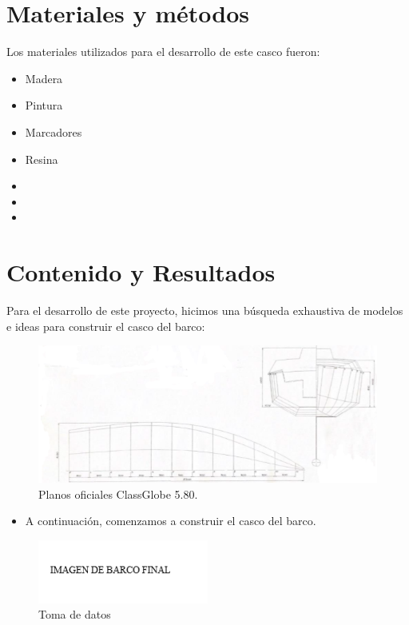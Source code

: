 \documentclass[a4paper,letterpaper]{article}
\begin{document}
\section*{Materiales y métodos}
Los materiales utilizados para el desarrollo de este casco fueron:
\begin{itemize}
	\item Madera
	\item Pintura
	\item Marcadores
	\item Resina
	\item
	\item
	\item
\end{itemize}
\newpage
\section*{Contenido y Resultados}
Para el desarrollo de este proyecto, hicimos una búsqueda exhaustiva de modelos e ideas para construir el casco del barco:
\begin{figure}[H]
	\centering
	\includegraphics[width=1 \textwidth]{imgbarcoplano.png}
	\caption{ Planos oficiales ClassGlobe 5.80.}
	\label{fig:imagen}
\end{figure}
\begin{itemize}
	\item A continuación, comenzamos a construir el casco del barco.
\end{itemize}
\begin{figure}[H]
	\centering
	\includegraphics[width=0.5\textwidth]{imgbarcofinal.png}
	\caption{Toma de datos}
	\label{fig:imagen1}
\end{figure}
\end{document}
